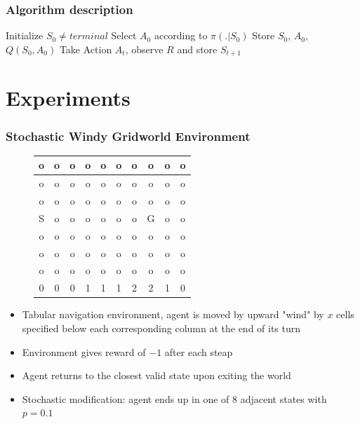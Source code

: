 \documentclass{beamer}
\begin{document}
\begin{frame}
  \frametitle{Algorithm description}
  \begin{algorithmic}
    \STATE Initialize $S_0 \neq {terminal}$
    \STATE Select $A_0$ according to $\pi(. | S_0)$
    \STATE Store $S_0$, $A_0$, $Q(S_0, A_0)$
        \STATE Take Action $A_t$, observe $R$ and store $S_{t + 1}$
      \ENDIF
    \ENDFOR
  \end{algorithmic}
\end{frame}

\section{Experiments}

\begin{frame}
  \frametitle{Stochastic Windy Gridworld Environment}
  \begin{figure}
    \centering
    \begin{tabular}{ | c | c | c | c | c | c | c | c | c | c | }
      \hline
      o & o & o & o & o & o & o & o & o & o\\ \hline
      o & o & o & o & o & o & o & o & o & o\\ \hline
      o & o & o & o & o & o & o & o & o & o\\ \hline
      S & o & o & o & o & o & o & G & o & o\\ \hline
      o & o & o & o & o & o & o & o & o & o\\ \hline
      o & o & o & o & o & o & o & o & o & o\\ \hline
      o & o & o & o & o & o & o & o & o & o\\ \hline
      0 & 0 & 0 & 1 & 1 & 1 & 2 & 2 & 1 & 0\\ \hline
    \end{tabular}
  \end{figure}
  \begin{itemize}
    \item Tabular navigation environment, agent is moved by upward "wind" by $x$
      cells specified below each corresponding column at the end of its turn
    \item Environment gives reward of $-1$ after each steap
    \item Agent returns to the closest valid state upon exiting the world
    \item Stochastic modification: agent ends up in one of 8 adjacent states
      with $p = 0.1$
  \end{itemize}
\end{frame}
\end{document}
